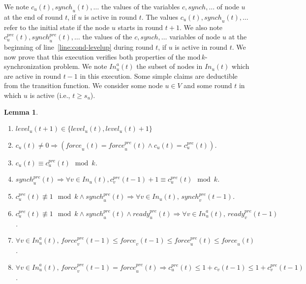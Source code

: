 \documentclass[11pt,letterpaper]{article}
\newtheorem{lem}[thm]{Lemma}
\newcommand{\edmargin}[2]{\marginpar{\raggedright\linespread{.7}\footnotesize #1: #2}}
\begin{document}
We note $c_u(t), \mathit{synch}_u(t), \dots$ the values of the variables $c, \mathit{synch}, \dots$ of node $u$ at the end of round $t$, if $u$ is active in round $t$.
The values $c_u(t), \mathit{synch}_u(t), \dots$\edmargin{sm}{These values?} refer to the initial state if the node $u$ starts in round $t+1$.
We also note $c^{pre}_u(t), \mathit{synch}^{pre}_u(t), \dots$ the values of the $c, \mathit{synch}, \dots$ variables
of node $u$ at the beginning of line~\ref{line:cond-levelup} during round $t$, if $u$ is active in round $t$.
We now prove that this execution verifies both properties of the $\mathrm{mod}\,k$-synchronization problem.
We note $\mathit{In}_u^a(t)$ the subset of nodes in $\mathit{In}_u(t)$ which are active in round $t-1$ in this execution.
Some simple claims are deductible from the transition function.
We consider some node $u \in V$ and some round $t$ in which $u$ is active (i.e., $t \geq s_u$).
\begin{lem} \hfill
	\begin{enumerate}[label=\upshape(\alph*),ref=\thethm (\alph*)]
		\item\label{lem:cl1} $\mathit{level}_u(t+1) \in \{\mathit{level}_u(t), \mathit{level}_u(t)+1\}$
		\item\label{lem:cl2b}$c_u(t) \neq 0 \Rightarrow (\mathit{force}_u(t) = \mathit{force}_u^{pre}(t) \wedge c_u(t) = c_u^{pre}(t))$.
		\item\label{lem:cl2} $c_u(t) \equiv c_u^{pre}(t) \mod k$.
		\item\label{lem:cl3} $\mathit{synch}_u^{pre}(t) \Rightarrow \forall v \in \mathit{In}_u(t), c_v^{pre}(t-1) + 1 \equiv c_u^{pre}(t) \mod k$.
		\item\label{lem:cl4} $c_u^{pre}(t) \not\equiv 1 \mod k \wedge \mathit{synch}_u^{pre}(t) \Rightarrow \forall v \in \mathit{In}_u(t),\, \mathit{synch}_v^{pre}(t-1)$.
		\item\label{lem:cl5} $c_u^{pre}(t) \not\equiv 1 \mod k \wedge \mathit{synch}_u^{pre}(t) \wedge \mathit{ready}_u^{pre}(t) \Rightarrow \forall v \in \mathit{In}_u^a(t),\, \mathit{ready}_v^{pre}(t-1)$.
		\item\label{lem:cl6} $\forall v \in \mathit{In}_u^a(t),\, \mathit{force}_v^{pre}(t-1) \leq \mathit{force}_v(t-1) \leq \mathit{force}_u^{pre}(t) \leq \mathit{force}_u(t)$.
		\item\label{lem:cl7} $\forall v \in \mathit{In}_u^a(t),\, \mathit{force}_v^{pre}(t-1) = \mathit{force}_u^{pre}(t) \Rightarrow c_u^{pre}(t) \leq 1+c_v(t-1) \leq 1+c_v^{pre}(t-1)$.
	\end{enumerate}
\end{lem}
\end{document}
